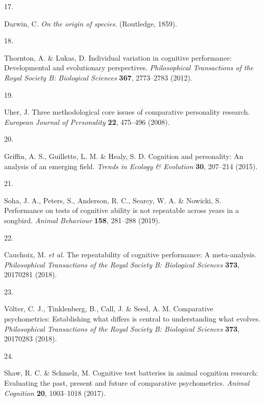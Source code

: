 \documentclass[
  man,floatsintext]{apa6}
\newlength{\cslhangindent}
\newlength{\csllabelwidth}
\newlength{\cslentryspacingunit} %
\newenvironment{CSLReferences}[2] %
 {%
  \setlength{\parindent}{0pt}
  \ifodd #1
  \let\oldpar\par
  \def\par{\hangindent=\cslhangindent\oldpar}
  \fi
  \setlength{\parskip}{#2\cslentryspacingunit}
 }%
 {}
\newcommand{\CSLLeftMargin}[1]{\parbox[t]{\csllabelwidth}{#1}}
\newcommand{\CSLRightInline}[1]{\parbox[t]{\linewidth - \csllabelwidth}{#1}\break}
\begin{document}
\begin{CSLReferences}{0}{0}
\leavevmode{}%
\CSLLeftMargin{17. }%
\CSLRightInline{Darwin, C. \emph{On the origin of species}. (Routledge, 1859).}

\leavevmode{}%
\CSLLeftMargin{18. }%
\CSLRightInline{Thornton, A. \& Lukas, D. Individual variation in cognitive performance: Developmental and evolutionary perspectives. \emph{Philosophical Transactions of the Royal Society B: Biological Sciences} \textbf{367}, 2773--2783 (2012).}

\leavevmode{}%
\CSLLeftMargin{19. }%
\CSLRightInline{Uher, J. Three methodological core issues of comparative personality research. \emph{European Journal of Personality} \textbf{22}, 475--496 (2008).}

\leavevmode{}%
\CSLLeftMargin{20. }%
\CSLRightInline{Griffin, A. S., Guillette, L. M. \& Healy, S. D. Cognition and personality: An analysis of an emerging field. \emph{Trends in Ecology \& Evolution} \textbf{30}, 207--214 (2015).}

\leavevmode{}%
\CSLLeftMargin{21. }%
\CSLRightInline{Soha, J. A., Peters, S., Anderson, R. C., Searcy, W. A. \& Nowicki, S. Performance on tests of cognitive ability is not repeatable across years in a songbird. \emph{Animal Behaviour} \textbf{158}, 281--288 (2019).}

\leavevmode{}%
\CSLLeftMargin{22. }%
\CSLRightInline{Cauchoix, M. \emph{et al.} The repeatability of cognitive performance: A meta-analysis. \emph{Philosophical Transactions of the Royal Society B: Biological Sciences} \textbf{373}, 20170281 (2018).}

\leavevmode{}%
\CSLLeftMargin{23. }%
\CSLRightInline{Völter, C. J., Tinklenberg, B., Call, J. \& Seed, A. M. Comparative psychometrics: Establishing what differs is central to understanding what evolves. \emph{Philosophical Transactions of the Royal Society B: Biological Sciences} \textbf{373}, 20170283 (2018).}

\leavevmode{}%
\CSLLeftMargin{24. }%
\CSLRightInline{Shaw, R. C. \& Schmelz, M. Cognitive test batteries in animal cognition research: Evaluating the past, present and future of comparative psychometrics. \emph{Animal Cognition} \textbf{20}, 1003--1018 (2017).}


\end{CSLReferences}
\end{document}
